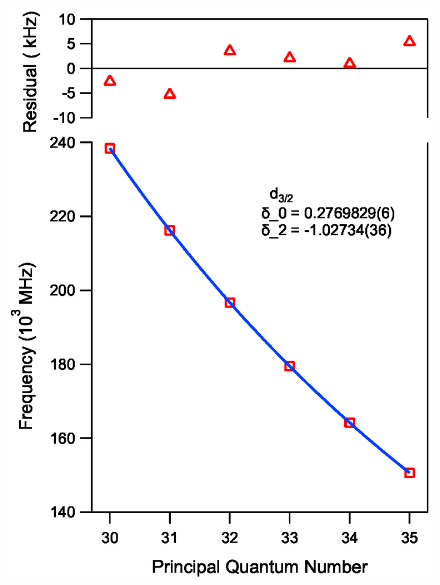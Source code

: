 \documentclass[landscape]{sciposter}
\begin{document}
\begin{multicols}{4}
\begin{figure}
\begin{center}
\includegraphics[scale = 0.9]{d32_qd.eps}

\end{center}
\end{figure}
\end{multicols}
\end{document}
